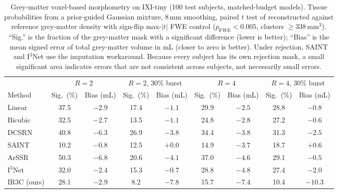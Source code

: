 \begin{table}[pos=!htbp]
\caption{Grey-matter voxel-based morphometry on IXI-tiny (100 test subjects, matched-budget models). Tissue probabilities from a prior-guided Gaussian mixture, 8\,mm smoothing, paired $t$ test of reconstructed against reference grey-matter density with sign-flip max-$|t|$ FWE control ($p_{\mathrm{FWE}}<0.005$, clusters $\ge338$\,mm$^3$). ``Sig.'' is the fraction of the grey-matter mask with a significant difference (lower is better); ``Bias'' is the mean signed error of total grey-matter volume in mL (closer to zero is better). Under rejection, SAINT and I$^3$Net use the imputation workaround. Because every subject has its own rejection mask, a small significant area indicates errors that are not consistent across subjects, not necessarily small errors.}
\label{tab:vbm}
\small
\begin{tabular*}{\textwidth}{@{\extracolsep{\fill}}lcccccccc@{}}
\toprule
 & \multicolumn{2}{c}{$R=2$} & \multicolumn{2}{c}{$R=2$, 30\% burst} & \multicolumn{2}{c}{$R=4$} & \multicolumn{2}{c}{$R=4$, 30\% burst} \\
\cmidrule(lr){2-3}\cmidrule(lr){4-5}\cmidrule(lr){6-7}\cmidrule(lr){8-9}
Method & Sig.\ (\%) & Bias (mL) & Sig.\ (\%) & Bias (mL) & Sig.\ (\%) & Bias (mL) & Sig.\ (\%) & Bias (mL) \\
\midrule
Linear & 37.5 & $-2.9$ & 17.4 & $-1.1$ & 29.9 & $-2.5$ & 28.8 & $-0.8$ \\
Bicubic & 32.5 & $-2.7$ & 13.5 & $-1.1$ & 24.8 & $-2.8$ & 27.2 & $-0.6$ \\
DCSRN & 40.8 & $-6.3$ & 26.9 & $-3.8$ & 34.4 & $-3.8$ & 31.3 & $-2.5$ \\
SAINT & 10.2 & $-0.8$ & 12.5 & $+0.0$ & 14.9 & $-3.7$ & 18.7 & $+0.6$ \\
ArSSR & 50.3 & $-6.8$ & 20.6 & $-4.1$ & 37.0 & $-4.6$ & 29.1 & $-0.5$ \\
I$^3$Net & 32.0 & $-2.4$ & 15.3 & $-0.7$ & 28.8 & $-4.8$ & 27.4 & $-2.0$ \\
IR3C (ours) & 28.1 & $-2.9$ & 8.2 & $-7.8$ & 15.7 & $-7.4$ & 10.4 & $-10.3$ \\
\bottomrule
\end{tabular*}
\end{table}
